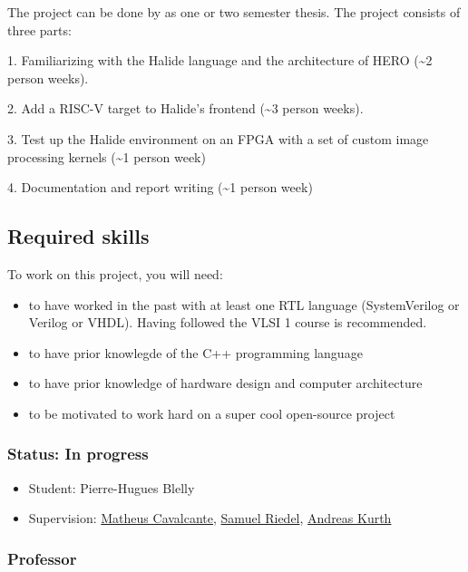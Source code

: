 The project can be done by as one or two semester thesis. The project
consists of three parts:

1. Familiarizing with the Halide language and the architecture of HERO
(\textasciitilde2 person weeks).

2. Add a RISC-V target to Halide's frontend (\textasciitilde3 person
weeks).

3. Test up the Halide environment on an FPGA with a set of custom image
processing kernels (\textasciitilde1 person week)

4. Documentation and report writing (\textasciitilde1 person week)

\hypertarget{required_skills}{%
\subsection{Required skills}\label{required_skills}}

To work on this project, you will need:

\begin{itemize}
\item
  to have worked in the past with at least one RTL language
  (SystemVerilog or Verilog or VHDL). Having followed the VLSI 1 course
  is recommended.
\item
  to have prior knowlegde of the C++ programming language
\item
  to have prior knowledge of hardware design and computer architecture
\item
  to be motivated to work hard on a super cool open-source project
\end{itemize}

\hypertarget{status_in_progress}{%
\subsubsection{Status: In progress}\label{status_in_progress}}

\begin{itemize}
\item
  Student: Pierre-Hugues Blelly
\item
  Supervision: \href{:User:Matheusd}{Matheus Cavalcante},
  \href{:User:Sriedel}{Samuel Riedel}, \href{:User:Akurth}{ Andreas
  Kurth}
\end{itemize}

\hypertarget{professor}{%
\subsubsection{Professor}\label{professor}}

